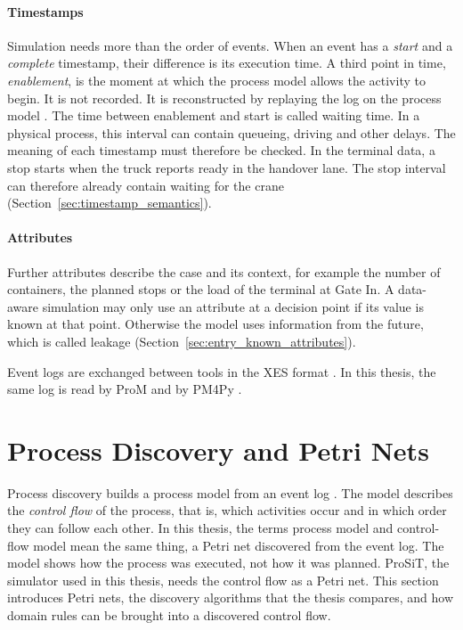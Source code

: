 \paragraph{Timestamps}
Simulation needs more than the order of events. When an event has a
\emph{start} and a \emph{complete} timestamp, their difference is its
execution time. A third point in time, \emph{enablement}, is the moment at
which the process model allows the activity to begin. It is not recorded. It is
reconstructed by replaying the log on the process model
\cite{PMRozinat2009,Vinci2026prosit}. The time between enablement and start is
called waiting time. In a physical process, this interval can contain queueing,
driving and other delays. The meaning of each timestamp must therefore be
checked. In the terminal data, a stop starts when the truck reports ready in the
handover lane. The stop interval can therefore already contain waiting for the
crane (Section~\ref{sec:timestamp_semantics}).

\paragraph{Attributes}
Further attributes describe the case and its context, for example the number of
containers, the planned stops or the load of the terminal at Gate In. A
data-aware simulation may only use an attribute at a decision point if its
value is known at that point. Otherwise the model uses information from the
future, which is called leakage (Section~\ref{sec:entry_known_attributes}).

Event logs are exchanged between tools in the XES format \cite{Aalst2016}.
In this thesis, the same log is read by ProM \cite{vanDongen2005ProM} and by
PM4Py \cite{Berti2023PM4Py}.

\section{Process Discovery and Petri Nets}
\label{sec:bg_discovery}

Process discovery builds a process model from an event log
\cite{Aalst2016}. The model describes the
\emph{control flow} of the process, that is, which activities occur and in
which order they can follow each other. In this thesis, the terms process
model and control-flow model mean the same thing, a Petri net discovered from
the event log. The model shows how the process was executed, not how it was
planned. ProSiT, the simulator used in this thesis, needs the control flow as a
Petri net. This section introduces Petri nets, the discovery algorithms that
the thesis compares, and how domain rules can be brought into a discovered
control flow.


